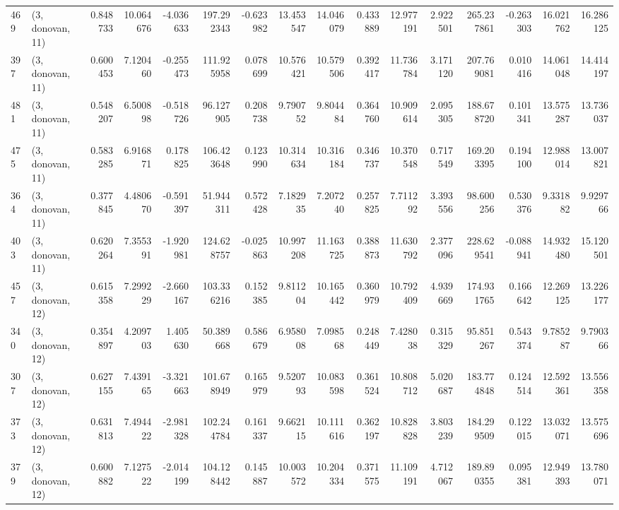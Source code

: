 \begin{tabular}{llrrrrrrrrrrrrrr}
469 &  (3, donovan, 11) &   0.848733 &  10.064676 &  -4.036633 &   197.292343 &  -0.623982 &  13.453547 &  14.046079 &  0.433889 &  12.977191 &   2.922501 &   265.237861 & -0.263303 &  16.021762 &  16.286125 \\
397 &  (3, donovan, 11) &   0.600453 &   7.120460 &  -0.255473 &   111.925958 &   0.078699 &  10.576421 &  10.579506 &  0.392417 &  11.736784 &   3.171120 &   207.769081 &  0.010416 &  14.061048 &  14.414197 \\
481 &  (3, donovan, 11) &   0.548207 &   6.500898 &  -0.518726 &    96.127905 &   0.208738 &   9.790752 &   9.804484 &  0.364760 &  10.909614 &   2.095305 &   188.678720 &  0.101341 &  13.575287 &  13.736037 \\
475 &  (3, donovan, 11) &   0.583285 &   6.916871 &   0.178825 &   106.423648 &   0.123990 &  10.314634 &  10.316184 &  0.346737 &  10.370548 &   0.717549 &   169.203395 &  0.194100 &  12.988014 &  13.007821 \\
364 &  (3, donovan, 11) &   0.377845 &   4.480670 &  -0.591397 &    51.944311 &   0.572428 &   7.182935 &   7.207240 &  0.257825 &   7.711292 &   3.393556 &    98.600256 &  0.530376 &   9.331882 &   9.929766 \\
403 &  (3, donovan, 11) &   0.620264 &   7.355391 &  -1.920981 &   124.628757 &  -0.025863 &  10.997208 &  11.163725 &  0.388873 &  11.630792 &   2.377096 &   228.629541 & -0.088941 &  14.932480 &  15.120501 \\
457 &  (3, donovan, 12) &   0.615358 &   7.299229 &  -2.660167 &   103.336216 &   0.152385 &   9.811204 &  10.165442 &  0.360979 &  10.792409 &   4.939669 &   174.931765 &  0.166642 &  12.269125 &  13.226177 \\
340 &  (3, donovan, 12) &   0.354897 &   4.209703 &   1.405630 &    50.389668 &   0.586679 &   6.958008 &   7.098568 &  0.248449 &   7.428038 &   0.315329 &    95.851267 &  0.543374 &   9.785287 &   9.790366 \\
307 &  (3, donovan, 12) &   0.627155 &   7.439165 &  -3.321663 &   101.678949 &   0.165979 &   9.520793 &  10.083598 &  0.361524 &  10.808712 &   5.020687 &   183.774848 &  0.124514 &  12.592361 &  13.556358 \\
373 &  (3, donovan, 12) &   0.631813 &   7.494422 &  -2.981328 &   102.244784 &   0.161337 &   9.662115 &  10.111616 &  0.362197 &  10.828828 &   3.803239 &   184.299509 &  0.122015 &  13.032071 &  13.575696 \\
379 &  (3, donovan, 12) &   0.600882 &   7.127522 &  -2.014199 &   104.128442 &   0.145887 &  10.003572 &  10.204334 &  0.371575 &  11.109191 &   4.712067 &   189.890355 &  0.095381 &  12.949393 &  13.780071 \\

\end{tabular}
